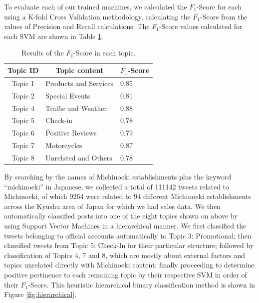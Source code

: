 \documentclass[review]{elsarticle}
\begin{document}
To evaluate each of our trained machines, we calculated the \(F_1\)-Score for each using a K-fold Cross Validation methodology, calculating the \(F_1\)-Score from the values of Precision and Recall calculations. The \(F_1\)-Score values calculated for each SVM are shown in Table \ref{tab:scores}.

\begin{table}[htp]
\centering
\caption{Results of the \(F_1\)-Score in each topic.}
\label{tab:scores}
\begin{tabular}{|c|l|l|}
\hline
\rowcolor[HTML]{C0C0C0} 
Topic ID & \multicolumn{1}{c|}{\cellcolor[HTML]{C0C0C0}Topic content} & \(F_1\)-Score \\ \hline
Topic 1 & Products and Services & 0.85 \\ \hline
Topic 2 & Special Events & 0.81 \\ \hline
Topic 4 & Traffic and Weather & 0.88 \\ \hline
Topic 5 & Check-in & 0.78 \\ \hline
Topic 6 & Positive Reviews & 0.79 \\ \hline
Topic 7 & Motorcycles & 0.87 \\ \hline
Topic 8 & Unrelated and Others & 0.78 \\ \hline
\end{tabular}
\end{table}

By searching by the names of Michinoeki establishments plus the keyword “michinoeki” in Japanese, we collected a total of \num[group-separator={,}]{111142} tweets related to Michinoeki, of which \num[group-separator={,}]{9264} were related to 94 different Michinoeki establishments across the Kyushu area of Japan for which we had sales data. We then automatically classified posts into one of the eight topics shown on above by using Support Vector Machines in a hierarchical manner. We first classified the tweets belonging to official accounts automatically to Topic 3: Promotional; then classified tweets from Topic 5: Check-In for their particular structure; followed by classification of Topics 4, 7 and 8, which are mostly about external factors and topics unrelated directly with Michinoeki content; finally proceeding to determine positive pertinence to each remaining topic by their respective SVM in order of their \(F_1\)-Score. This heuristic hierarchical binary classification method is shown in Figure \ref{fig:hierarchical}.
\end{document}
